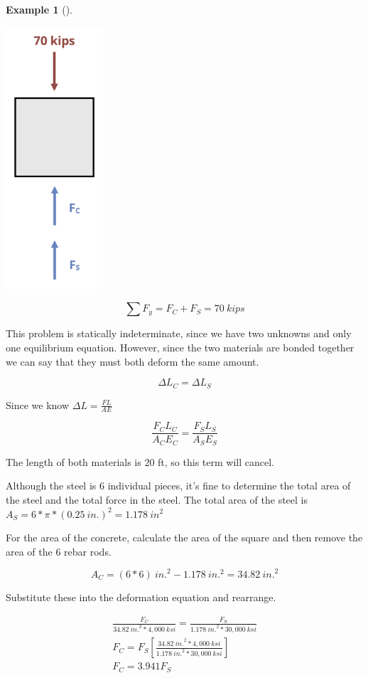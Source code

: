 \documentclass[
  letterpaper,
  DIV=11,
  numbers=noendperiod]{scrreprt}
\theoremstyle{definition}
\newtheorem{example}{Example}[chapter]
\theoremstyle{remark}
\begin{document}
\begin{tcolorbox}
\begin{example}[]
\begin{tcolorbox}
\begin{center}
\includegraphics[width=1.42708in,height=\textheight]{images/PNGs/Example 5.7 copy.png}
\end{center}

\[
\sum F_y= F_C+F_S=70{~kips}
\]

This problem is statically indeterminate, since we have two unknowns and
only one equilibrium equation. However, since the two materials are
bonded together we can say that they must both deform the same amount.

\[
\Delta L_C=\Delta L_S
\]

Since we know \(\Delta L=\frac{F L}{A E}\)

\[
\frac{F_C L_C}{A_C E_C}=\frac{F_S L_S}{A_S E_S}
\]

The length of both materials is 20 ft, so this term will cancel.

Although the steel is 6 individual pieces, it's fine to determine the
total area of the steel and the total force in the steel. The total area
of the steel is \(A_S=6 * \pi * (0.25{~in.})^2=1.178{~in}^2\)

For the area of the concrete, calculate the area of the square and then
remove the area of the 6 rebar rods.

\[
A_C=(6 * 6){~in.}^2-1.178{~in.^2}=34.82{~in.}^2
\]

Substitute these into the deformation equation and rearrange.

\[
\begin{gathered}
\frac{F_C}{34.82{~in.}^2 * 4,000{~ksi}}=\frac{F_S}{1.178{~in.}^2 * 30,000{~ksi}} \\
F_C=F_S\left[\frac{34.82{~in.}^2 * 4,000{~ksi}}{1.178{~in.}^2 * 30,000{~ksi}}\right] \\
F_C=3.941 F_S
\end{gathered}
\]


\end{tcolorbox}
\end{example}
\end{tcolorbox}
\end{document}
